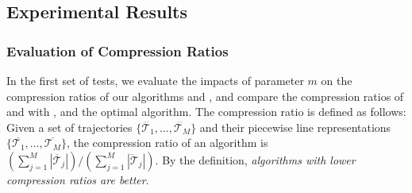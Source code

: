 \subsection{Experimental Results}


\subsubsection{Evaluation of Compression Ratios}


In the first set of tests, we evaluate the impacts of parameter $m$ on the
compression ratios of our algorithms \cist and \cista, and compare the compression ratios of \cist and \cista with \dps, \squishe and the optimal algorithm.
%
The compression ratio is defined as follows: Given a set of trajectories $\{\dddot{\mathcal{T}_1}, \ldots, \dddot{\mathcal{T}_M}\}$ and their piecewise line representations $\{\overline{\mathcal{T}_1}, \ldots, \overline{\mathcal{T}_M}\}$, the compression ratio of an algorithm is $(\sum_{j=1}^{M} |\overline{\mathcal{T}}_j |)/(\sum_{j=1}^{M} |\dddot{\mathcal{T}}_j |)$.
By the definition, \emph{algorithms with lower compression ratios are better}.







